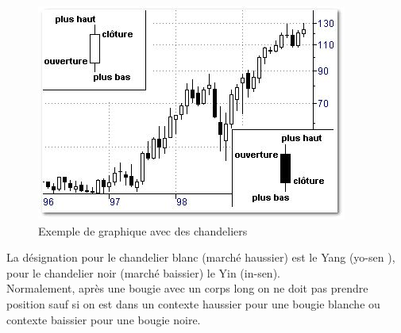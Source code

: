 \begin{figure}[H]
  \center
  \includegraphics[scale=0.5]{../graph/chandelier.png}
  \caption{Exemple de graphique avec des chandeliers}
\end{figure}

 La désignation pour le chandelier blanc (marché haussier) est le Yang (yo-sen ), pour le chandelier noir (marché baissier) le Yin (in-sen). \\
 
Normalement, après une bougie avec un corps long on ne doit pas prendre position sauf si on est dans un contexte haussier pour une bougie blanche ou contexte baissier pour une bougie noire. 

